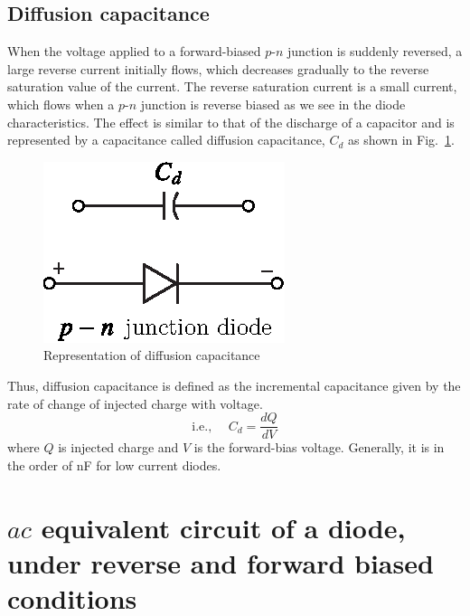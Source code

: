 \subsection{Diffusion capacitance}\label{subsec1.19.2}

When the voltage applied to a forward-biased $p$-$n$ junction is
suddenly reversed, a large reverse current initially flows, which
decreases gradually to the reverse saturation value of the
current. The reverse saturation current is a small current, which flows
when a $p$-$n$ junction is reverse biased as we see in the diode
characteristics. The effect is similar to that of the discharge of a
capacitor and is represented by a capacitance called diffusion
capacitance, $C_d$ as shown in Fig.~\ref{fig1.17}.
\begin{figure}[H]
\centering
\includegraphics{chap1/fig1.17.eps}
\caption{Representation of diffusion capacitance}\label{fig1.17}
\end{figure}

Thus, diffusion capacitance is defined as the incremental capacitance
given by the rate of change of injected charge with voltage.
\begin{equation}
\text{i.e., } \quad C_d = \frac{dQ}{dV} \label{eq1.8}
\end{equation}
where $Q$ is injected charge and $V$ is the forward-bias
voltage. Generally, it is in the order of nF for low current diodes.

\eject

\section[$ac$ equivalent circuit of a diode, under reverse and forward
biased conditions]{\boldmath$ac$ equivalent circuit of a diode, under reverse and forward
biased conditions}\label{sec1.20}


